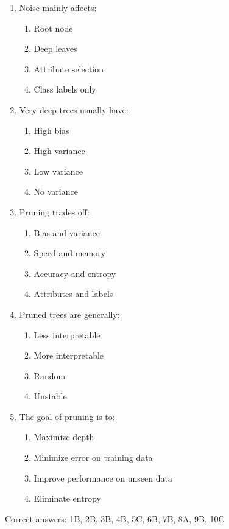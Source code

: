 \documentclass[3pt]{article}
\begin{document}
\begin{enumerate}
		\item Noise mainly affects:
		\begin{enumerate}
			\item Root node
			\item Deep leaves
			\item Attribute selection
			\item Class labels only
		\end{enumerate}
		
		\item Very deep trees usually have:
		\begin{enumerate}
			\item High bias
			\item High variance
			\item Low variance
			\item No variance
		\end{enumerate}
		
		\item Pruning trades off:
		\begin{enumerate}
			\item Bias and variance
			\item Speed and memory
			\item Accuracy and entropy
			\item Attributes and labels
		\end{enumerate}
		
		\item Pruned trees are generally:
		\begin{enumerate}
			\item Less interpretable
			\item More interpretable
			\item Random
			\item Unstable
		\end{enumerate}
		
		\item The goal of pruning is to:
		\begin{enumerate}
			\item Maximize depth
			\item Minimize error on training data
			\item Improve performance on unseen data
			\item Eliminate entropy
		\end{enumerate}
	\end{enumerate}
	
	Correct answers: 1B, 2B, 3B, 4B, 5C, 6B, 7B, 8A, 9B, 10C
	
\end{document}
